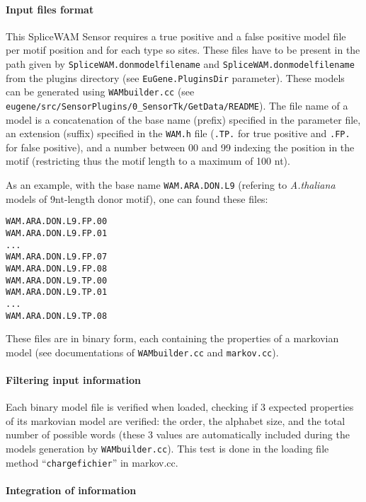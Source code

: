 \paragraph{Input files format}

This SpliceWAM Sensor requires a true positive and a false positive
model file per motif position and for each type so sites. These files
have to be present in the path given by
\texttt{SpliceWAM.don\-modelfilename} and
\texttt{SpliceWAM.donmodelfilename} from the plugins directory (see
\texttt{EuGene.\-PluginsDir} parameter). These models can be generated
using \texttt{WAMbuilder.cc} (see
\texttt{eugene/src/\-SensorPlugins/0\_SensorTk/GetData/README}).  The
file name of a model is a concatenation of the base name (prefix)
specified in the parameter file, an extension (suffix) specified in
the \texttt{WAM.h} file (\texttt{.TP.} for true positive and
\texttt{.FP.}  for false positive), and a number between 00 and 99
indexing the position in the motif (restricting thus the motif length
to a maximum of 100 nt).

As an example, with the base name \texttt{WAM.ARA.DON.L9} (refering to
{\em A.thaliana} models of 9nt-length donor motif), one can found these files:
\begin{Verbatim}[fontsize=\small]
WAM.ARA.DON.L9.FP.00
WAM.ARA.DON.L9.FP.01
...
WAM.ARA.DON.L9.FP.07
WAM.ARA.DON.L9.FP.08
WAM.ARA.DON.L9.TP.00
WAM.ARA.DON.L9.TP.01
...
WAM.ARA.DON.L9.TP.08
\end{Verbatim}

These files are in binary form, each containing the properties of a
markovian model (see documentations of \texttt{WAMbuilder.cc} and
\texttt{markov.cc}).

\paragraph{Filtering input information}

Each binary model file is verified when loaded, checking if 3 expected
properties of its markovian model are verified: the order, the
alphabet size, and the total number of possible words (these 3 values
are automatically included during the models generation by
\texttt{WAMbuilder.cc}). This test is done in the loading file method
``\texttt{chargefichier}'' in markov.cc.

\paragraph{Integration of information}


